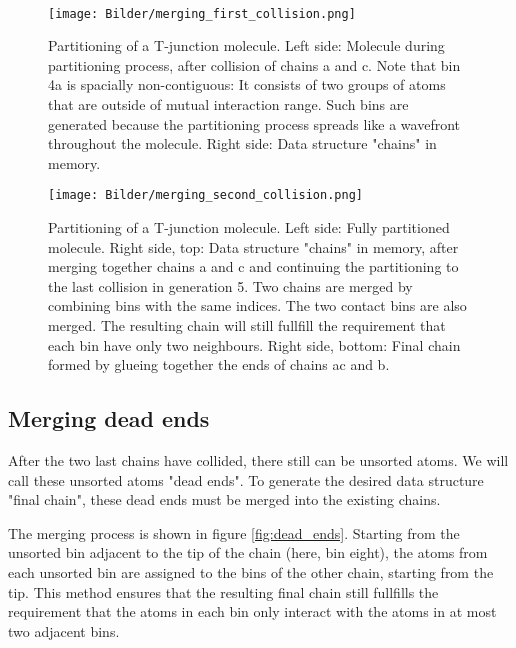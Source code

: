 \documentclass[11pt,a4paper]{article}
\begin{document}
\

\begin{figure}[h]
   \centering
   \texttt{[image: Bilder/merging\_first\_collision.png]}
   \caption{Partitioning of a T-junction molecule. Left side: Molecule during partitioning process, after collision of chains a and c. Note that bin 4a is spacially non-contiguous: It consists of two groups of atoms that are outside of mutual interaction range. Such bins are generated because the partitioning process spreads like a wavefront throughout the molecule.  Right side: Data structure "chains" in memory.}
   \label{fig:merging_first_collision}
\end{figure}


\begin{figure}[h]
   \centering
   \texttt{[image: Bilder/merging\_second\_collision.png]}
   \caption{Partitioning of a T-junction molecule. Left side: Fully partitioned molecule.  Right side, top: Data structure "chains" in memory, after merging together chains a and c and continuing the partitioning to the last collision in generation 5. Two chains are merged by combining bins with the same indices. The two contact bins are also merged. The resulting chain will still fullfill the requirement that each bin have only two neighbours. Right side, bottom: Final chain formed by glueing together the ends of chains ac and b.}
   \label{fig:merging_second_collision}
\end{figure}

\newpage
\vspace*{10cm}
\subsection{Merging dead ends}

After the two last chains have collided, there still can be unsorted atoms. We will call these unsorted atoms "dead ends". To generate the desired data structure "final chain", these dead ends must be merged into the existing chains.

The merging process is shown in figure \ref{fig:dead_ends}. Starting from the unsorted bin adjacent to the tip of the chain (here, bin eight), the atoms from each unsorted bin are assigned to the bins of the other chain, starting from the tip. This method ensures that the resulting final chain still fullfills the requirement that the atoms in each bin only interact with the atoms in at most two adjacent bins.
\end{document}
